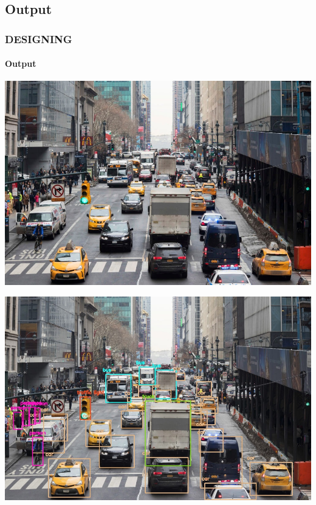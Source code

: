 \documentclass[
	11pt, %
	aspectratio=169, %
]{beamer}
\begin{document}
\subsection{Output}
\begin{frame}
	\frametitle{DESIGNING}
	\framesubtitle{Output} %
		\begin{center}
		\begin{minipage}{0.45\textwidth}
			\includegraphics[width=\textwidth]{before.jpeg}
		\end{minipage} \hspace{0.5cm}
		\begin{minipage}{0.45\textwidth}
			\includegraphics[width=\textwidth]{after.jpeg}
		\end{minipage}
		\label{name_label}
	\end{center}
	
\end{frame}
\end{document}
